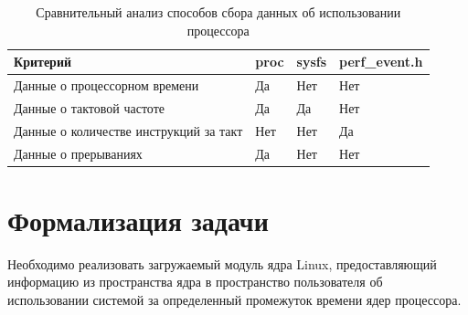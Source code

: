 \begin{table}[H]
	\centering
	\caption{Сравнительный анализ способов сбора данных об использовании процессора}
	\label{tbl:methods-compare}
	\begin{tabularx}{\textwidth}{|X|X|X|X|}
		\hline
		\textbf{Критерий} & \textbf{proc} & \textbf{sysfs} & \textbf{perf\_event.h} \\
		\hline
		Данные о процессорном времени & Да & Нет & Нет \\
		\hline
		Данные о тактовой частоте & Да & Да & Нет \\
		\hline
		Данные о количестве инструкций за такт & Нет & Нет & Да \\
		\hline
		Данные о прерываниях & Да & Нет & Нет \\
		\hline
	\end{tabularx}
\end{table}

\section{Формализация задачи}

Необходимо реализовать загружаемый модуль ядра Linux, предоставляющий информацию из пространства ядра в пространство пользователя об использовании системой за определенный промежуток времени ядер процессора. 